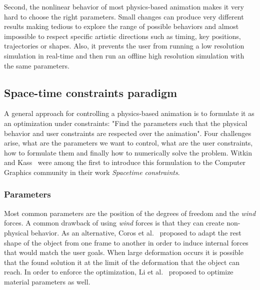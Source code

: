 Second, the nonlinear behavior of most physics-based animation makes it very hard to choose the right parameters. Small changes can produce very different results making tedious to explore the range of possible behaviors and almost impossible to respect specific artistic directions such as timing, key positions, trajectories or shapes. Also, it prevents the user from running a low resolution simulation in real-time and then run an offline high resolution simulation with the same parameters.

\subsection{Space-time constraints paradigm}
A general approach for controlling a physics-based animation is to formulate it as an optimization under constraints: "Find the parameters such that the physical behavior and user constraints are respected over the animation". Four challenges arise, what are the parameters we want to control, what are the user constraints, how to formulate them and finally how to numerically solve the problem. Witkin and Kass~\cite{Witkin1988} were among the first to introduce this formulation to the Computer Graphics community in their work \emph{Spacetime constraints}.

\subsubsection{Parameters}
Most common parameters are the position of the degrees of freedom and the \emph{wind} forces. A common drawback of using \emph{wind} forces is that they can create non-physical behavior. As an alternative, Coros et al.~\cite{Coros2012} proposed to adapt the rest shape of the object from one frame to another in order to induce internal forces that would match the user goals. When large deformation occurs it is possible that the found solution it at the limit of the deformation that the object can reach. In order to enforce the optimization, Li et al.~\cite{Li2014} proposed to optimize material parameters as well. 

